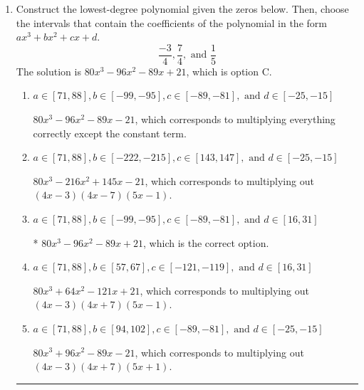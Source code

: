 \documentclass{extbook}[14pt]
\newcommand{\litem}[1]{\item #1

\rule{\textwidth}{0.4pt}}
\begin{document}
\begin{enumerate}\litem{
Construct the lowest-degree polynomial given the zeros below. Then, choose the intervals that contain the coefficients of the polynomial in the form $ax^3+bx^2+cx+d$.
\[ \frac{-3}{4}, \frac{7}{4}, \text{ and } \frac{1}{5} \]The solution is \( 80x^{3} -96 x^{2} -89 x + 21 \), which is option C.\begin{enumerate}[label=\Alph*.]
\item \( a \in [71, 88], b \in [-99, -95], c \in [-89, -81], \text{ and } d \in [-25, -15] \)

$80x^{3} -96 x^{2} -89 x -21$, which corresponds to multiplying everything correctly except the constant term.
\item \( a \in [71, 88], b \in [-222, -215], c \in [143, 147], \text{ and } d \in [-25, -15] \)

$80x^{3} -216 x^{2} +145 x -21$, which corresponds to multiplying out $(4x -3)(4x -7)(5x -1)$.
\item \( a \in [71, 88], b \in [-99, -95], c \in [-89, -81], \text{ and } d \in [16, 31] \)

* $80x^{3} -96 x^{2} -89 x + 21$, which is the correct option.
\item \( a \in [71, 88], b \in [57, 67], c \in [-121, -119], \text{ and } d \in [16, 31] \)

$80x^{3} +64 x^{2} -121 x + 21$, which corresponds to multiplying out $(4x -3)(4x + 7)(5x -1)$.
\item \( a \in [71, 88], b \in [94, 102], c \in [-89, -81], \text{ and } d \in [-25, -15] \)

$80x^{3} +96 x^{2} -89 x -21$, which corresponds to multiplying out $(4x -3)(4x + 7)(5x + 1)$.
\end{enumerate}

}
\end{enumerate}
\end{document}
